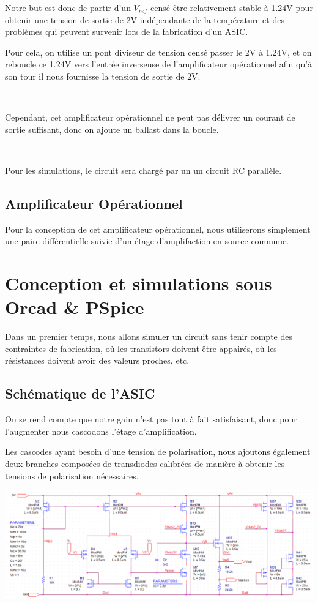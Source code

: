 \documentclass{article}
\begin{document}
Notre but est donc de partir d’un $V_{ref}$ censé être relativement stable à 1.24V pour obtenir une tension de sortie de 2V indépendante de la température et des problèmes qui peuvent survenir lors de la fabrication d’un ASIC.

Pour cela, on utilise un pont diviseur de tension censé passer le 2V à 1.24V, et on reboucle ce 1.24V vers l’entrée inverseuse de l’amplificateur opérationnel afin qu’à son tour il nous fournisse la tension de sortie de 2V.

~

Cependant, cet amplificateur opérationnel ne peut pas délivrer un courant de sortie suffisant, donc on ajoute un ballast dans la boucle.

~

Pour les simulations, le circuit sera chargé par un un circuit RC parallèle.

\subsection{Amplificateur Opérationnel}

Pour la conception de cet amplificateur opérationnel, nous utiliserons simplement une paire différentielle suivie d’un étage d’amplifaction en source commune.

\newpage

\section{Conception et simulations sous Orcad \& PSpice}

Dans un premier temps, nous allons simuler un circuit sans tenir compte des contraintes de fabrication, où les transistors doivent être appairés, où les résistances doivent avoir des valeurs proches, etc.

\subsection{Schématique de l’ASIC}

On se rend compte que notre gain n’est pas tout à fait satisfaisant, donc pour l’augmenter nous cascodons l’étage d’amplification.

Les cascodes ayant besoin d’une tension de polarisation, nous ajoutons également deux branches composées de transdiodes calibrées de manière à obtenir les tensions de polarisation nécessaires.

\includegraphics[width=\linewidth]{schema_asic.png}
\end{document}
